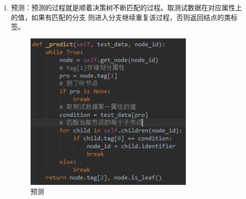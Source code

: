 \documentclass[UTF8,a4paper,12pt]{article}
\begin{document}
\begin{enumerate}[itemindent=0.5em,label=\arabic*、]
\begin{figure}[h]
  \end{figure}
  \item 预测：预测的过程就是顺着决策树不断匹配的过程。取测试数据在对应属性上的值，如果有匹配的分支
  则进入分支继续重复该过程，否则返回结点的类标签。
  \begin{figure}[h]
  \begin{center}
  \includegraphics[width=0.8\textwidth]{p6.png} %
  \caption{预测}
  \end{center}
  \end{figure}
\end{enumerate}
\end{document}
